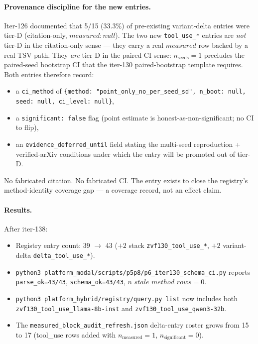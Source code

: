 \documentclass{article}
\begin{document}
\paragraph{Provenance discipline for the new entries.}
Iter-126 documented that 5/15 (33.3\%) of pre-existing variant-delta
entries were tier-D (citation-only, $\mathit{measured}: \mathit{null}$).
The two new \texttt{tool\_use\_*} entries are \emph{not} tier-D in the
citation-only sense --- they carry a real $\mathit{measured}$ row
backed by a real TSV path. They \emph{are} tier-D in the paired-CI
sense: $n_{\text{seeds}}=1$ precludes the paired-seed bootstrap CI
that the iter-130 paired-bootstrap template requires. Both entries
therefore record:
\begin{itemize}
\item a \texttt{ci\_method} of
  \texttt{\{method: "point\_only\_no\_per\_seed\_sd", n\_boot: null,
  seed: null, ci\_level: null\}},
\item a \texttt{significant: false} flag (point estimate is
  honest-as-non-significant; no CI to flip),
\item an \texttt{evidence\_deferred\_until} field stating the
  multi-seed reproduction + verified-arXiv conditions under which
  the entry will be promoted out of tier-D.
\end{itemize}
No fabricated citation. No fabricated CI. The entry exists to close
the registry's method-identity coverage gap --- a coverage record,
not an effect claim.

\paragraph{Results.}
After iter-138:
\begin{itemize}
\item Registry entry count: 39 $\to$ 43
  ($+2$ stack \texttt{zvf130\_tool\_use\_*},
  $+2$ variant-delta \texttt{delta\_tool\_use\_*}).
\item \texttt{python3 platform_modal/scripts/p5p8/p6\_iter130\_schema\_ci.py} reports
  \texttt{parse\_ok=43/43}, \texttt{schema\_ok=43/43},
  $\mathit{n\_stale\_method\_rows}=0$.
\item \texttt{python3 platform_hybrid/registry/query.py list} now includes both
  \texttt{zvf130\_tool\_use\_llama-8b-inst} and
  \texttt{zvf130\_tool\_use\_qwen3-32b}.
\item The \texttt{measured\_block\_audit\_refresh.json} delta-entry
  roster grows from 15 to 17 (tool\_use rows added with
  $n_{\text{measured}}=1$, $n_{\text{significant}}=0$).
\end{itemize}
\end{document}
